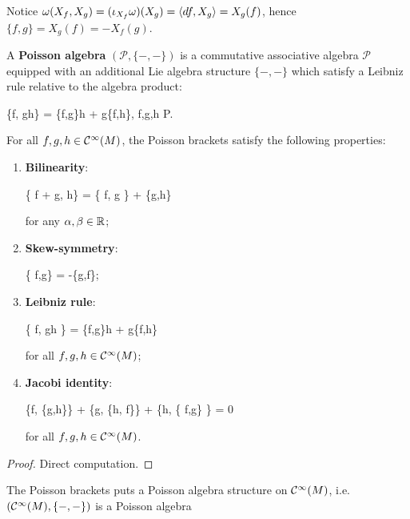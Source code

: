 \documentclass[main.tex]{subfiles}
\begin{document}
Notice $\omega(X_f, X_g) = (\iota_{X_f}\omega)(X_g) = \langle df, X_g \rangle = X_g (f)$, hence $\{ f, g \} = X_g(f) = - X_f(g)$.

\begin{definition}
	A \textbf{Poisson algebra} $(\mathcal P, \{-,-\})$ is a commutative associative algebra $\mathcal P$ equipped with an additional Lie algebra structure $\{-,-\}$ which satisfy a Leibniz rule relative to the algebra product:
	\begin{eqalign}
		\{f, gh\} = \{f,g\}h + g\{f,h\}, \quad \forall f,g,h \in \mathcal P.
	\end{eqalign}
\end{definition}

\begin{theorem}
	For all $f,g,h \in \mathcal{C}^\infty(M)$, the Poisson brackets satisfy the following properties:
	\begin{enumerate}
		\item \textbf{Bilinearity}:
		\begin{eqalign}
			\{ \alpha f + \beta g, h\} = \alpha \{ f, g \} + \beta \{g,h\}
		\end{eqalign}
		for any $\alpha, \beta \in \mathbb{R}$;
		\item \textbf{Skew-symmetry}:
		\begin{eqalign}
			\{ f,g\} = -\{g,f\};
		\end{eqalign}
		\item \textbf{Leibniz rule}:
		\begin{eqalign}
			\{ f, gh \} = \{f,g\}h + g\{f,h\}
		\end{eqalign}
		for all $f,g,h \in \mathcal{C}^\infty(M)$;
		\item \textbf{Jacobi identity}:
		\begin{eqalign}
			\{f, \{g,h\}\} + \{g, \{h, f\}\} + \{h, \{ f,g\} \} = 0
		\end{eqalign}
		for all $f,g,h \in \mathcal{C}^\infty(M)$.
	\end{enumerate}
\end{theorem}
\begin{proof}
Direct computation.
\end{proof}

\begin{corollary}
	The Poisson brackets puts a Poisson algebra structure on $\mathcal{C}^\infty(M)$, i.e. $(\mathcal{C}^\infty(M), \{ - , -\})$ is a Poisson algebra
\end{corollary}
\end{document}
